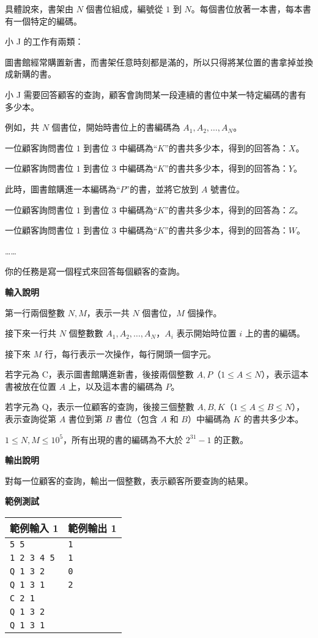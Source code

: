     具體說來，書架由 $N$ 個書位組成，編號從 $1$ 到 $N$。每個書位放著一本書，每本書有一個特定的編碼。
    
    小 J 的工作有兩類：
    
    圖書館經常購置新書，而書架任意時刻都是滿的，所以只得將某位置的書拿掉並換成新購的書。
    
    小 J 需要回答顧客的查詢，顧客會詢問某一段連續的書位中某一特定編碼的書有多少本。
    
    例如，共 $N$ 個書位，開始時書位上的書編碼為 $A_1, A_2, \ldots , A_N$。
    
    一位顧客詢問書位 $1$ 到書位 $3$ 中編碼為“$K$”的書共多少本，得到的回答為：$X$。
    
    一位顧客詢問書位 $1$ 到書位 $3$ 中編碼為“$K$”的書共多少本，得到的回答為：$Y$。
    
    此時，圖書館購進一本編碼為“$P$”的書，並將它放到 $A$ 號書位。
    
    一位顧客詢問書位 $1$ 到書位 $3$ 中編碼為“$K$”的書共多少本，得到的回答為：$Z$。
    
    一位顧客詢問書位 $1$ 到書位 $3$ 中編碼為“$K$”的書共多少本，得到的回答為：$W$。
    
    ……
    
    你的任務是寫一個程式來回答每個顧客的查詢。

    \textbf{輸入說明}

    第一行兩個整數 $N, M$，表示一共 $N$ 個書位，$M$ 個操作。

    接下來一行共 $N$ 個整數數 $A_1, A_2, \ldots , A_N$，$A_i$ 表示開始時位置 $i$ 上的書的編碼。

    接下來 $M$ 行，每行表示一次操作，每行開頭一個字元。

    若字元為 C，表示圖書館購進新書，後接兩個整數 $A, P$（$1 \le A \le N$），表示這本書被放在位置 $A$ 上，以及這本書的編碼為 $P$。

    若字元為 Q，表示一位顧客的查詢，後接三個整數 $A, B, K$（$1 \le A \le B \le N$），表示查詢從第 $A$ 書位到第 $B$ 書位（包含 $A$ 和 $B$）中編碼為 $K$ 的書共多少本。

    $1 \le N, M \le {10}^5$，所有出現的書的編碼為不大於 $2^{31} - 1$ 的正數。

    \textbf{輸出說明}

    對每一位顧客的查詢，輸出一個整數，表示顧客所要查詢的結果。

    \textbf{範例測試}

    \begin{tabular}{|m{7cm}|m{7cm}|}
        \hline
        範例輸入 1 & 範例輸出 1 \\
        \hline
        \verb|5 5| & \verb|1| \\
        \verb|1 2 3 4 5| & \verb|1| \\
        \verb|Q 1 3 2| & \verb|0| \\
        \verb|Q 1 3 1| & \verb|2| \\
        \verb|C 2 1| & \\
        \verb|Q 1 3 2| & \\
        \verb|Q 1 3 1| & \\
        \hline
    \end{tabular}

